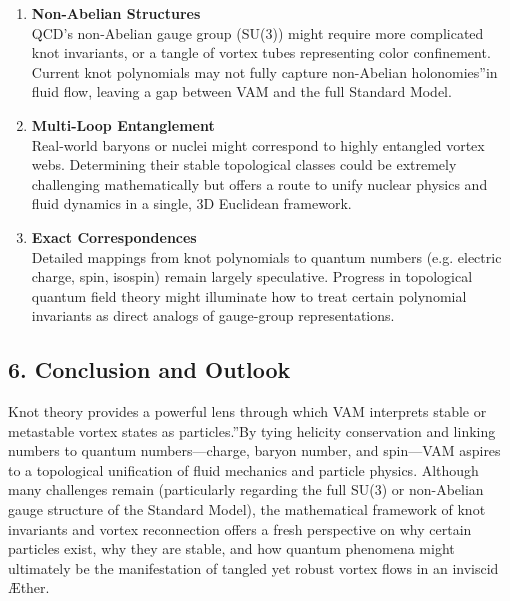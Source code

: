\begin{enumerate}
    \item \textbf{Non-Abelian Structures} \\
    QCD's non-Abelian gauge group (SU(3)) might require more complicated knot invariants, or a tangle of vortex tubes representing color confinement. Current knot polynomials may not fully capture non-Abelian \grqq holonomies\textquotedblright in fluid flow, leaving a gap between VAM and the full Standard Model.
    \item \textbf{Multi-Loop Entanglement} \\
    Real-world baryons or nuclei might correspond to highly entangled vortex webs. Determining their stable topological classes could be extremely challenging mathematically but offers a route to unify nuclear physics and fluid dynamics in a single, 3D Euclidean framework.
    \item \textbf{Exact Correspondences} \\
    Detailed mappings from knot polynomials to quantum numbers (e.g. electric charge, spin, isospin) remain largely speculative. Progress in topological quantum field theory might illuminate how to treat certain polynomial invariants as direct analogs of gauge-group representations.
\end{enumerate}

\subsection*{6. Conclusion and Outlook}

Knot theory provides a powerful lens through which VAM interprets stable or metastable vortex states as \grqq particles.\textquotedblright By tying helicity conservation and linking numbers to quantum numbers—charge, baryon number, and spin—VAM aspires to a topological unification of fluid mechanics and particle physics. Although many challenges remain (particularly regarding the full SU(3) or non-Abelian gauge structure of the Standard Model), the mathematical framework of knot invariants and vortex reconnection offers a fresh perspective on why certain particles exist, why they are stable, and how quantum phenomena might ultimately be the manifestation of tangled yet robust vortex flows in an inviscid Æther.